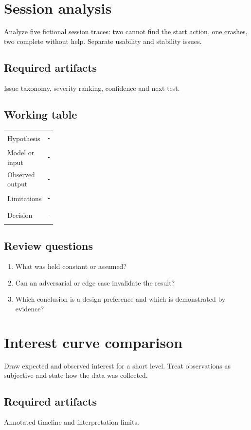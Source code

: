 \documentclass[11pt]{article}
\begin{document}
\section{Session analysis}
Analyze five fictional session traces: two cannot find the start action, one crashes, two complete without help. Separate usability and stability issues.


\subsection{Required artifacts}
Issue taxonomy, severity ranking, confidence and next test.


\subsection{Working table}
\begin{tabularx}{\linewidth}{@{}p{0.20\linewidth}X@{}}\toprule
Hypothesis & \rule{0.90\linewidth}{0.4pt}\\[0.35cm]
Model or input & \rule{0.90\linewidth}{0.4pt}\\[0.35cm]
Observed output & \rule{0.90\linewidth}{0.4pt}\\[0.35cm]
Limitations & \rule{0.90\linewidth}{0.4pt}\\[0.35cm]
Decision & \rule{0.90\linewidth}{0.4pt}\\\bottomrule\end{tabularx}

\subsection{Review questions}
\begin{enumerate}
\item What was held constant or assumed?
\item Can an adversarial or edge case invalidate the result?
\item Which conclusion is a design preference and which is demonstrated by evidence?
\end{enumerate}

\section{Interest curve comparison}
Draw expected and observed interest for a short level. Treat observations as subjective and state how the data was collected.


\subsection{Required artifacts}
Annotated timeline and interpretation limits.
\end{document}
